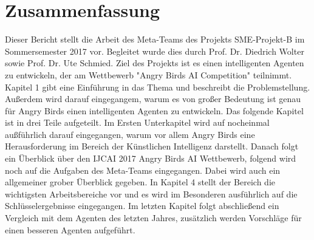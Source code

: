 \section{Zusammenfassung}
Dieser Bericht stellt die Arbeit des Meta-Teams des Projekts SME-Projekt-B im Sommersemester 2017 vor. Begleitet wurde dies durch Prof. Dr. Diedrich Wolter sowie Prof. Dr. Ute Schmied. Ziel des Projekts ist es einen intelligenten Agenten zu entwickeln, der am Wettbewerb "Angry Birds AI Competition" teilnimmt.\\
Kapitel 1 gibt eine Einführung in das Thema und beschreibt die Problemstellung. Außerdem wird darauf eingegangem, warum es von großer Bedeutung ist genau für Angry Birds einen intelligenten Agenten zu entwickeln. Das folgende Kapitel ist in drei Teile aufgeteilt. Im Ersten Unterkapitel wird auf nocheinmal außführlich darauf eingegangen, warum vor allem Angry Birds eine Herausforderung im Bereich der Künstlichen Intelligenz darstellt. Danach folgt ein Überblick über den IJCAI 2017 Angry Birds AI Wettbewerb, folgend wird noch auf die Aufgaben des Meta-Teams eingegangen. Dabei wird auch ein allgemeiner grober Überblick gegeben.
In Kapitel 4 stellt der Bereich die wichtigsten Arbeitsbereiche vor und es wird im Besonderen ausführlich auf die Schlüsselergebnisse eingegangen.
Im letzten Kapitel folgt abschließend ein Vergleich mit dem Agenten des letzten Jahres, zusätzlich werden Vorschläge für einen besseren Agenten aufgeführt.
